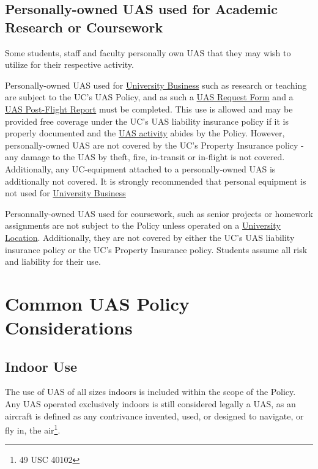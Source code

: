 \documentclass[
]{book}
\begin{document}
\hypertarget{personally-owned-uas-used-for-academic-research-or-coursework}{%
\section{Personally-owned UAS used for Academic Research or Coursework}\label{personally-owned-uas-used-for-academic-research-or-coursework}}

Some students, staff and faculty personally own UAS that they may wish to utilize for their respective activity.

Personally-owned UAS used for \protect\hyperlink{UB}{University Business} such as research or teaching are subject to the UC's UAS Policy, and as such a \protect\hyperlink{FR}{UAS Request Form} and a \protect\hyperlink{postflight}{UAS Post-Flight Report} must be completed. This use is allowed and may be provided free coverage under the UC's UAS liability insurance policy if it is properly documented and the \protect\hyperlink{UASactivity}{UAS activity} abides by the Policy. However, personally-owned UAS are not covered by the UC's Property Insurance policy - any damage to the UAS by theft, fire, in-transit or in-flight is not covered. Additionally, any UC-equipment attached to a personally-owned UAS is additionally not covered. It is strongly recommended that personal equipment is not used for \protect\hyperlink{UB}{University Business}

Personnally-owned UAS used for coursework, such as senior projects or homework assignments are not subject to the Policy unless operated on a \protect\hyperlink{UL}{University Location}. Additionally, they are not covered by either the UC's UAS liability insurance policy or the UC's Property Insurance policy. Students assume all risk and liability for their use.

\hypertarget{ch-common-considerations}{%
\chapter{Common UAS Policy Considerations}\label{ch-common-considerations}}

\hypertarget{indoor-use}{%
\section{Indoor Use}\label{indoor-use}}

The use of UAS of all sizes indoors is included within the scope of the Policy. Any UAS operated exclusively indoors is still considered legally a UAS, as an aircraft is defined as any contrivance invented, used, or designed to navigate, or fly in, the air\footnote{49 USC 40102}.
\end{document}
